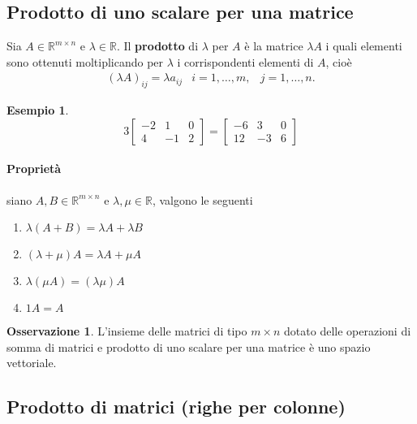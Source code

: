 \documentclass{book}
\theoremstyle{definition}
\newtheorem{es}{Esempio}[section]
\newtheorem{oss}{Osservazione}[section]
\theoremstyle{plain}
\begin{document}
\subsection{Prodotto di uno scalare per una matrice}
\label{sec:prodmatrice}

Sia $A\in \mathds{R}^{m\times n}$ e $\lambda \in \mathds{R}$. Il
\textbf{prodotto} di $\lambda$ per $A$ è la matrice $\lambda A$ i quali
elementi sono ottenuti moltiplicando per $\lambda$ i corrispondenti
elementi di $A$, cioè
\begin{eqnarray*}
  (\lambda A)_{ij}=\lambda a_{ij} & i = 1,\dots,m, & j=1,\dots,n.
\end{eqnarray*}
\begin{es}
  \label{es:prodmatrice1}
  \begin{equation*}
    3
    \begin{bmatrix}
      -2 & 1 & 0\\
      4 & -1 & 2
    \end{bmatrix} =
    \begin{bmatrix}
      -6 & 3 & 0\\
      12 & -3 & 6
    \end{bmatrix}
  \end{equation*}
  
\end{es}

\paragraph{Proprietà}

siano $A,B\in \mathds{R}^{m\times n}$ e $\lambda, \mu \in \mathds{R}$, valgono le
seguenti
\begin{enumerate}
\item $\lambda (A+B)=\lambda A+\lambda B$
\item $(\lambda + \mu)A=\lambda A+\mu A$
\item $\lambda (\mu A)=(\lambda\mu) A$
\item $1A=A$
\end{enumerate}
\begin{oss}
  \label{oss:prodmatrice1}
  L'insieme delle matrici di tipo $m\times n$ dotato delle operazioni di
  somma di matrici e prodotto di uno scalare per una matrice è uno
  spazio vettoriale.
\end{oss}

\subsection{Prodotto di matrici (righe per colonne)}
\label{sec:prodmtxrigcol}
\end{document}
